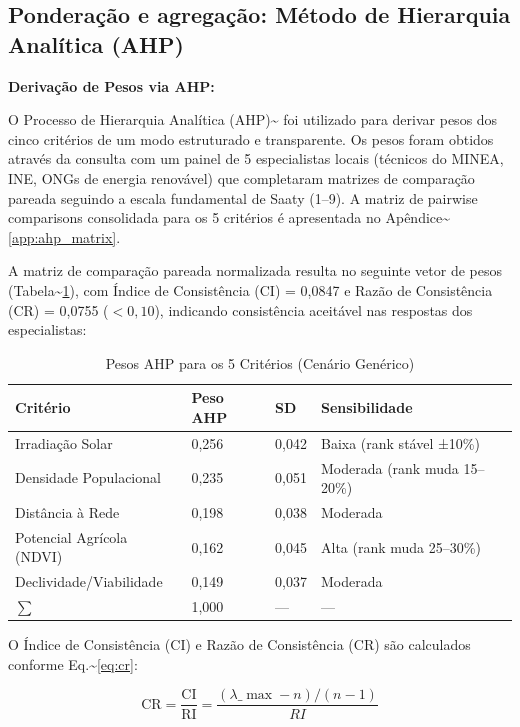 \documentclass[12pt, a4paper]{article}
\begin{document}
\subsection{Ponderação e agregação: Método de Hierarquia Analítica (AHP)}


\noindent\textbf{Derivação de Pesos via AHP:}

O Processo de Hierarquia Analítica (AHP)\textasciitilde{}\citep{Saaty1987} foi utilizado para derivar pesos dos cinco critérios de um modo estruturado e transparente. Os pesos foram obtidos através da consulta com um painel de 5 especialistas locais (técnicos do MINEA, INE, ONGs de energia renovável) que completaram matrizes de comparação pareada seguindo a escala fundamental de Saaty (1–9). A matriz de pairwise comparisons consolidada para os 5 critérios é apresentada no Apêndice\textasciitilde{}\ref{app:ahp_matrix}.

A matriz de comparação pareada normalizada resulta no seguinte vetor de pesos (Tabela\textasciitilde{}\ref{tab:ahp_weights}), com Índice de Consistência (CI) = 0,0847 e Razão de Consistência (CR) = 0,0755 ($< 0,10$), indicando consistência aceitável nas respostas dos especialistas:

\begin{table}[H]
\centering
\caption{Pesos AHP para os 5 Critérios (Cenário Genérico)}
\label{tab:ahp_weights}

\small
\begin{tabular}{llll}
\toprule
\rowcolor{LightBlue}\textbf{Critério} & \textbf{Peso AHP} & \textbf{SD} & \textbf{Sensibilidade} \\
\midrule
Irradiação Solar & 0,256 & 0,042 & Baixa (rank stável ±10\%) \\
Densidade Populacional & 0,235 & 0,051 & Moderada (rank muda 15–20\%) \\
Distância à Rede & 0,198 & 0,038 & Moderada \\
Potencial Agrícola (NDVI) & 0,162 & 0,045 & Alta (rank muda 25–30\%) \\
Declividade/Viabilidade & 0,149 & 0,037 & Moderada \\
\midrule
$\sum$ & 1,000 & --- & --- \\
\bottomrule
\end{tabular}
\end{table}


\noindent O Índice de Consistência (CI) e Razão de Consistência (CR) são calculados conforme Eq.\textasciitilde{}\ref{eq:cr}:

\begin{equation}
\label{eq:cr}
\text{CR} = \frac{\text{CI}}{\text{RI}} = \frac{(\lambda\_{\max} - n)/(n-1)}{RI}
\end{equation}
\end{document}
